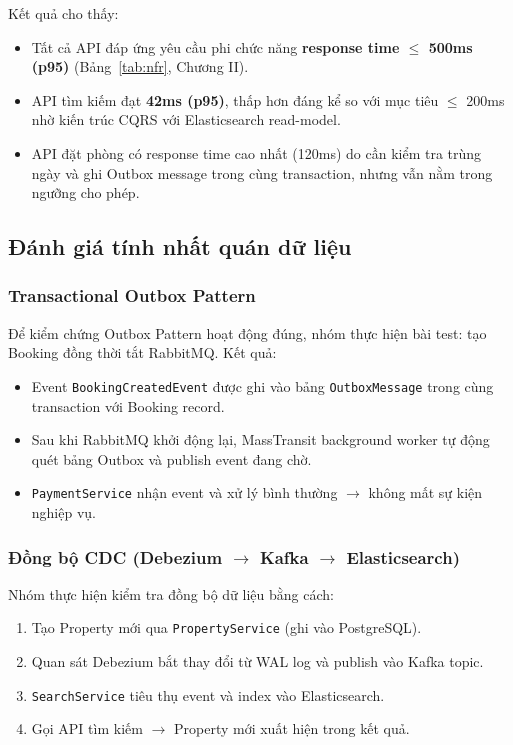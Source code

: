 \noindent Kết quả cho thấy:
\begin{itemize}
    \item Tất cả API đáp ứng yêu cầu phi chức năng \textbf{response time $\leq$ 500ms (p95)} (Bảng~\ref{tab:nfr}, Chương II).
    \item API tìm kiếm đạt \textbf{42ms (p95)}, thấp hơn đáng kể so với mục tiêu $\leq$ 200ms nhờ kiến trúc CQRS với Elasticsearch read-model.
    \item API đặt phòng có response time cao nhất (120ms) do cần kiểm tra trùng ngày và ghi Outbox message trong cùng transaction, nhưng vẫn nằm trong ngưỡng cho phép.
\end{itemize}

\subsection{Đánh giá tính nhất quán dữ liệu}
\label{subsec:danh_gia_nhat_quan}

\subsubsection{Transactional Outbox Pattern}
\label{subsubsec:danh_gia_outbox}

Để kiểm chứng Outbox Pattern hoạt động đúng, nhóm thực hiện bài test: tạo Booking đồng thời tắt RabbitMQ. Kết quả:
\begin{itemize}
    \item Event \texttt{BookingCreatedEvent} được ghi vào bảng \texttt{OutboxMessage} trong cùng transaction với Booking record.
    \item Sau khi RabbitMQ khởi động lại, MassTransit background worker tự động quét bảng Outbox và publish event đang chờ.
    \item \texttt{PaymentService} nhận event và xử lý bình thường $\to$ không mất sự kiện nghiệp vụ.
\end{itemize}

\subsubsection{Đồng bộ CDC (Debezium $\to$ Kafka $\to$ Elasticsearch)}
\label{subsubsec:danh_gia_cdc}

Nhóm thực hiện kiểm tra đồng bộ dữ liệu bằng cách:
\begin{enumerate}
    \item Tạo Property mới qua \texttt{PropertyService} (ghi vào PostgreSQL).
    \item Quan sát Debezium bắt thay đổi từ WAL log và publish vào Kafka topic.
    \item \texttt{SearchService} tiêu thụ event và index vào Elasticsearch.
    \item Gọi API tìm kiếm $\to$ Property mới xuất hiện trong kết quả.
\end{enumerate}

